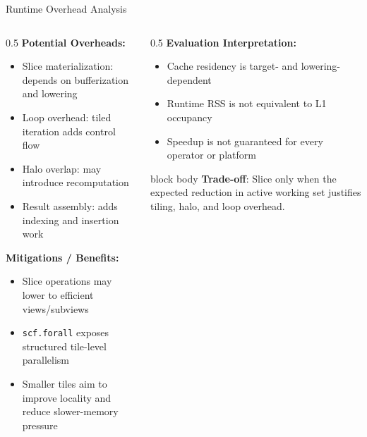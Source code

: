 \documentclass[10pt,aspectratio=169]{beamer}
\begin{document}
\begin{frame}{Runtime Overhead Analysis}
\begin{columns}
\begin{column}{0.5\textwidth}
\textbf{Potential Overheads:}
\begin{itemize}
\small
\item \textcolor{edgered}{Slice materialization}: depends on bufferization and lowering
\item \textcolor{edgered}{Loop overhead}: tiled iteration adds control flow
\item \textcolor{edgered}{Halo overlap}: may introduce recomputation
\item \textcolor{edgered}{Result assembly}: adds indexing and insertion work
\end{itemize}

\vspace{0.25cm}
\textbf{Mitigations / Benefits:}
\begin{itemize}
\small
\item Slice operations may lower to efficient views/subviews
\item \texttt{scf.forall} exposes structured tile-level parallelism
\item Smaller tiles aim to improve locality and reduce slower-memory pressure
\end{itemize}
\end{column}

\begin{column}{0.5\textwidth}
\textbf{Evaluation Interpretation:}
\begin{itemize}
\small
\item Cache residency is target- and lowering-dependent
\item Runtime RSS is not equivalent to L1 occupancy
\item Speedup is not guaranteed for every operator or platform
\end{itemize}

\vspace{0.35cm}
\begin{beamercolorbox}[sep=0.35em,center,rounded=true,shadow=true]{block body}
\small
\textbf{Trade-off}: Slice only when the expected reduction in active working set justifies tiling, halo, and loop overhead.
\end{beamercolorbox}
\end{column}
\end{columns}
\end{frame}
\end{document}

